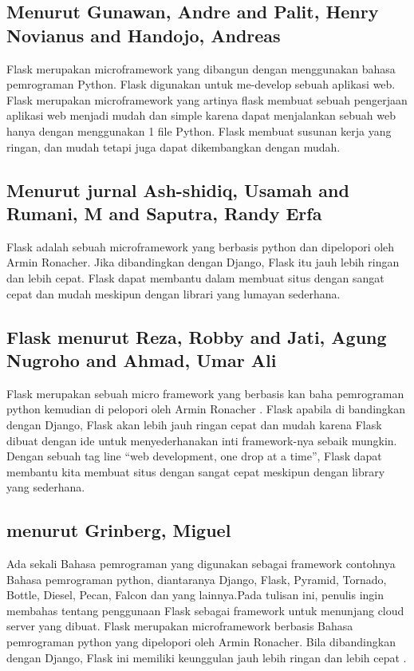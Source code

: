 \subsection{Menurut Gunawan, Andre and Palit, Henry Novianus and Handojo, Andreas}
Flask merupakan microframework yang dibangun dengan menggunakan bahasa pemrograman Python. Flask digunakan untuk me-develop sebuah aplikasi web. Flask merupakan microframework yang artinya flask membuat sebuah pengerjaan aplikasi web menjadi mudah dan simple karena dapat menjalankan sebuah web hanya dengan menggunakan 1 file Python. Flask membuat susunan kerja yang ringan, dan mudah tetapi juga dapat dikembangkan dengan mudah\cite{gunawan2018aplikasi}.

\subsection{Menurut jurnal Ash-shidiq, Usamah and Rumani, M and Saputra, Randy Erfa}
Flask adalah sebuah microframework yang berbasis python dan dipelopori oleh Armin Ronacher. Jika dibandingkan dengan Django, Flask itu jauh lebih ringan dan lebih cepat. Flask dapat membantu dalam membuat situs dengan sangat cepat dan mudah meskipun dengan librari yang lumayan sederhana\cite{ash2017perancangan}.

\subsection{Flask menurut Reza, Robby and Jati, Agung Nugroho and Ahmad, Umar Ali}
Flask merupakan sebuah micro framework yang berbasis kan baha pemrograman python kemudian di pelopori oleh Armin Ronacher . Flask apabila  di bandingkan dengan Django, Flask akan lebih jauh ringan  cepat dan mudah  karena  Flask  dibuat   dengan  ide  untuk menyederhanakan  inti  framework-nya  sebaik  mungkin. Dengan sebuah tag line “web development, one drop at a time”, Flask dapat membantu kita membuat situs dengan sangat cepat meskipun dengan library yang sederhana\cite{reza2016perancangan}.

\subsection{menurut Grinberg, Miguel}
Ada sekali Bahasa pemrograman yang digunakan sebagai framework contohnya Bahasa pemrograman python, diantaranya Django, Flask, Pyramid, Tornado, Bottle, Diesel, Pecan, Falcon dan yang lainnya.Pada tulisan ini, penulis ingin membahas tentang penggunaan Flask sebagai framework untuk menunjang cloud server yang dibuat. Flask merupakan microframework berbasis Bahasa pemrograman python yang dipelopori oleh Armin Ronacher. Bila dibandingkan dengan Django, Flask ini memiliki keunggulan jauh lebih ringan dan lebih cepat \cite{grinberg2018flask}.

